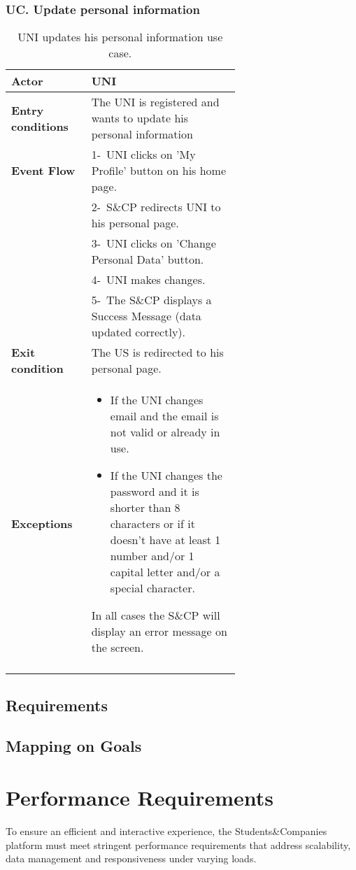 \subsubsection*{UC\cuc . Update personal information}
\begin{center}
    \begin{longtable}{|l|p{0.65\linewidth}|}
        \hline
        \textbf{Actor}            & UNI \\
        \hline
        \textbf{Entry conditions} & The UNI is registered and wants to update his personal information\\
        \hline
        \textbf{Event Flow}       & 1-\ UNI clicks on 'My Profile' button on his home page. \\
        & 2-\ S\&CP redirects UNI to his personal page. \\
        & 3-\ UNI clicks on 'Change Personal Data' button.\\
        & 4-\ UNI makes changes.\\
        & 5-\ The S\&CP displays a Success Message (data updated correctly).\\
        \hline
        \textbf{Exit condition}   &  The US is redirected to his personal page. \\
        \hline
        \textbf{Exceptions}       & \begin{itemize}
            \item If the UNI changes email and the email is not valid or already in use. 
            \item If the UNI changes the password and it is shorter than 8 characters or if it doesn’t have at least 1 number and/or 1 capital letter and/or a special character.  
        \end{itemize} In all cases the S\&CP will display an error message on the screen.  \\
        \hline
        \caption{UNI updates his personal information use case.}
        \label{tab: pi_use_case}
    \end{longtable}
\end{center}

\subsection{Requirements}
\subsection{Mapping on Goals}
\section{Performance Requirements}
To ensure an efficient and interactive experience, the Students\&Companies platform must meet stringent performance requirements that address scalability, data management and responsiveness under varying loads.

